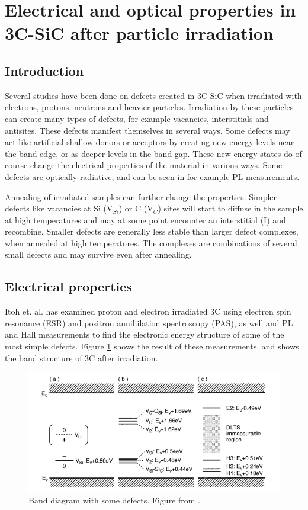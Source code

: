 \documentclass[a4paper,12pt]{article}
\begin{document}
\section*{Electrical and optical properties in 3C-SiC after particle irradiation}
\subsection*{Introduction}
Several studies have been done on defects created in 3C SiC when irradiated with electrons, protons, neutrons and heavier particles. Irradiation by these particles can create many types of defects, for example vacancies, interstitials and antisites. These defects manifest themselves in several ways. Some defects may act like artificial shallow donors or acceptors by creating new energy levels near the band edge, or as deeper levels in the band gap. These new energy states do of course change the electrical properties of the material in various ways. Some defects are optically radiative, and can be seen in for example PL-measurements. 

Annealing of irradiated samples can further change the properties. Simpler defects like vacancies at Si (V$_{Si}$) or C (V$_C$) sites will start to diffuse in the sample at high temperatures and may at some point encounter an interstitial (I) and recombine. Smaller defects are generally less stable than larger defect complexes, when annealed at high temperatures. The complexes are combinations of several small defects and may survive even after annealing. 

 \newpage
{}

\subsection*{Electrical properties}

Itoh et. al. \cite{Itoh1997} has examined proton and electron irradiated 3C using electron spin resonance (ESR) and positron annihilation spectroscopy (PAS), as well and PL and Hall measurements to find the electronic energy structure of some of the most simple defects. Figure \ref{fig:band1} shows the result of these measurements, and shows the band structure of 3C after irradiation. 

\begin{figure}[H]
\begin{center}
\includegraphics[scale=0.5]{band1.png}
\caption{Band diagram with some defects. Figure from \cite{Itoh1997}.
\label{fig:band1}}
\end{center}
\end{figure}
\end{document}
